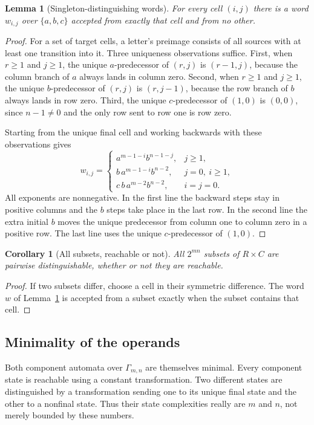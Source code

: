 \documentclass[11pt,letterpaper]{article}
\numberwithin{equation}{section}
\newtheorem{lemma}[theorem]{Lemma}
\newtheorem{corollary}[theorem]{Corollary}
\theoremstyle{definition}
\theoremstyle{remark}
\begin{document}
\begin{lemma}[Singleton-distinguishing words]\label{lem:threeletter}
For every cell $(i,j)$ there is a word $w_{i,j}$ over $\{a,b,c\}$ accepted
from exactly that cell and from no other.
\end{lemma}
\begin{proof}
For a set of target cells, a letter's preimage consists of all sources with at
least one transition into it. Three uniqueness observations suffice. First,
when $r\ge1$ and $j\ge1$, the unique $a$-predecessor of $(r,j)$ is $(r-1,j)$,
because the column branch of $a$ always lands in column zero. Second, when
$r\ge1$ and $j\ge1$, the unique $b$-predecessor of $(r,j)$ is $(r,j-1)$,
because the row branch of $b$ always lands in row zero. Third, the unique
$c$-predecessor of $(1,0)$ is $(0,0)$, since $n-1\ne0$ and the only row sent
to row one is row zero.

Starting from the unique final cell and working backwards with these
observations gives
\begin{equation}\label{eq:distwords}
 w_{i,j}=\begin{cases}
 a^{m-1-i}b^{n-1-j},&j\ge1,\\[2pt]
 b\,a^{m-1-i}b^{n-2},&j=0,\ i\ge1,\\[2pt]
 c\,b\,a^{m-2}b^{n-2},&i=j=0.
 \end{cases}
\end{equation}
All exponents are nonnegative. In the first line the backward steps stay in
positive columns and the $b$ steps take place in the last row. In the second
line the extra initial $b$ moves the unique predecessor from column one to
column zero in a positive row. The last line uses the unique $c$-predecessor
of $(1,0)$.
\end{proof}

\begin{corollary}[All subsets, reachable or not]\label{cor:subsetsdistinct}
All $2^{mn}$ subsets of $R\times C$ are pairwise distinguishable, whether or
not they are reachable.
\end{corollary}
\begin{proof}
If two subsets differ, choose a cell in their symmetric difference. The word
$w$ of Lemma~\ref{lem:threeletter} is accepted from a subset exactly when the
subset contains that cell.
\end{proof}

\subsection{Minimality of the operands}
Both component automata over $\Gamma_{m,n}$ are themselves minimal.
Every component state is reachable using a constant transformation. Two
different states are distinguished by a transformation sending one to its
unique final state and the other to a nonfinal state. Thus their state
complexities really are $m$ and $n$, not merely bounded by these numbers.
\end{document}
